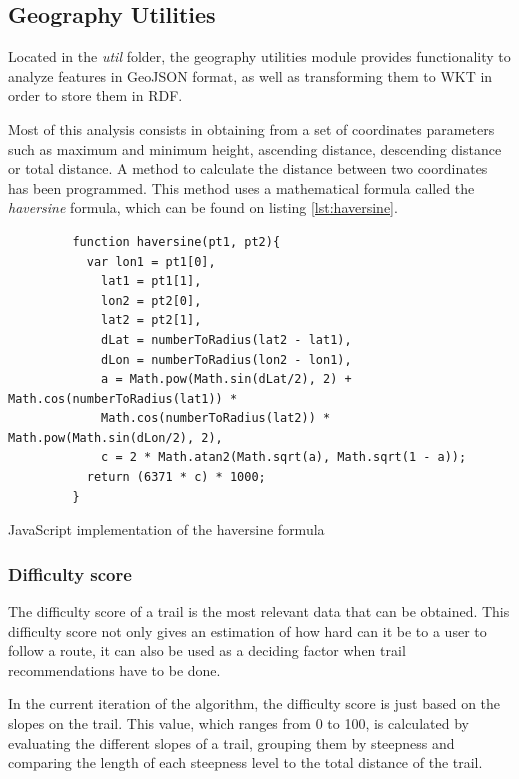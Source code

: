 \subsection{Geography Utilities}

Located in the \textit{util} folder, the geography utilities module provides functionality to analyze features in GeoJSON format, as well as transforming them to WKT in order to store them in RDF.

Most of this analysis consists in obtaining from a set of coordinates parameters such as maximum and minimum height, ascending distance, descending distance or total distance. A method to calculate the distance between two coordinates has been programmed. This method uses a mathematical formula called the \textit{haversine} formula, which can be found on listing \ref{lst:haversine}.

\begin{listing}[ht]\centering
  \begin{minipage}{.9\textwidth}
    \begin{verbatim}
         function haversine(pt1, pt2){
           var lon1 = pt1[0],
             lat1 = pt1[1],
             lon2 = pt2[0],
             lat2 = pt2[1],
             dLat = numberToRadius(lat2 - lat1),
             dLon = numberToRadius(lon2 - lon1),
             a = Math.pow(Math.sin(dLat/2), 2) + Math.cos(numberToRadius(lat1)) *
             Math.cos(numberToRadius(lat2)) * Math.pow(Math.sin(dLon/2), 2),
             c = 2 * Math.atan2(Math.sqrt(a), Math.sqrt(1 - a));
           return (6371 * c) * 1000;
         }
    \end{verbatim}
  \end{minipage}
  \caption{JavaScript implementation of the haversine formula}\label{lst:haversine}
\end{listing}

\subsubsection*{Difficulty score}

The difficulty score of a trail is the most relevant data that can be obtained. This difficulty score not only gives an estimation of how hard can it be to a user to follow a route, it can also be used as a deciding factor when trail recommendations have to be done.

In the current iteration of the algorithm, the difficulty score is just based on the slopes on the trail. This value, which ranges from 0 to 100, is calculated by evaluating the different slopes of a trail, grouping them by steepness and comparing the length of each steepness level to the total distance of the trail.

